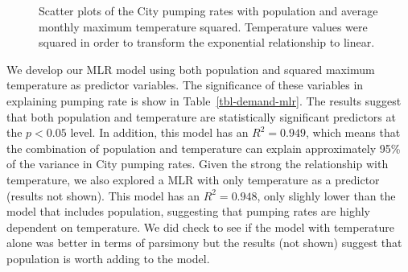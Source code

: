 \documentclass[
  letterpaper,
  DIV=11,
  numbers=noendperiod]{scrartcl}
\begin{document}
\begin{figure}


\caption{\label{fig-pop-temp-scatter}Scatter plots of the City pumping
rates with population and average monthly maximum temperature squared.
Temperature values were squared in order to transform the exponential
relationship to linear.}

\end{figure}%

We develop our MLR model using both population and squared maximum
temperature as predictor variables. The significance of these variables
in explaining pumping rate is show in Table~\ref{tbl-demand-mlr}. The
results suggest that both population and temperature are statistically
significant predictors at the \(p<0.05\) level. In addition, this model
has an \(R^2 = 0.949\), which means that the combination of population
and temperature can explain approximately 95\% of the variance in City
pumping rates. Given the strong the relationship with temperature, we
also explored a MLR with only temperature as a predictor (results not
shown). This model has an \(R^2 = 0.948\), only slighly lower than the
model that includes population, suggesting that pumping rates are highly
dependent on temperature. We did check to see if the model with
temperature alone was better in terms of parsimony but the results (not
shown) suggest that population is worth adding to the model.
\end{document}
